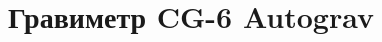 \documentclass[10pt,twoside]{geodmanual}
\title{Гравиметр CG-6 Autograv\texttrademark{}}
\begin{document}
\newcommand{\cg}{CG-6 Autograv\texttrademark{}}

\maketitle
\tableofcontents








%
%
\end{document}
